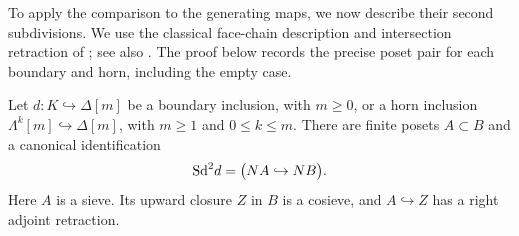 To apply the comparison to the generating maps, we now describe their
second subdivisions.  We use the classical face-chain description and
intersection retraction of \cite[Proposition~4.2]{Thomason1980}; see also
\cite[Lemmas~4.8 and~4.10]{AraMaltsiniotis2014}. The proof below records
the precise poset pair for each boundary and horn, including the empty case.

\begin{lemma}
\label{lem:subdivision-posets}
Let $d:K\hookrightarrow\Delta[m]$ be a boundary inclusion, with $m\geq0$,
or a horn inclusion $\Lambda^k[m]\hookrightarrow\Delta[m]$, with
$m\geq1$ and $0\leq k\leq m$.  There are finite posets $A\subset B$
and a canonical identification
\[
 \mathrm{Sd}^2 d=\bigl(N A\hookrightarrow N B\bigr).
\]
Here $A$ is a sieve.  Its upward closure $Z$ in $B$ is a cosieve, and
$A\hookrightarrow Z$ has a right adjoint retraction.
\end{lemma}

